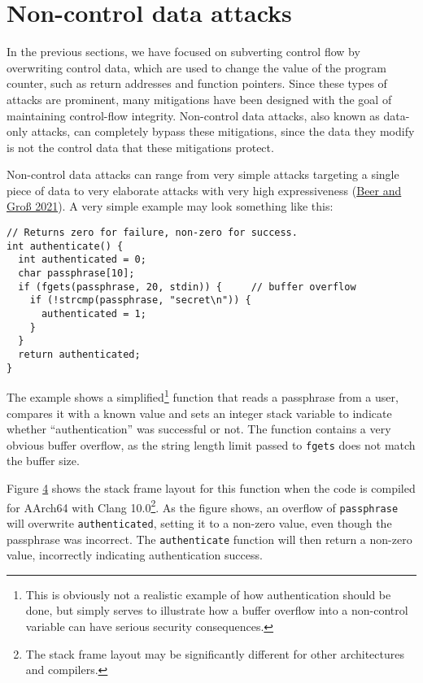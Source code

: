 \documentclass[
  a4paper,
]{report}
\begin{document}
\hypertarget{non-control-data-attacks}{%
\section{Non-control data attacks}\label{non-control-data-attacks}}

In the previous sections, we have focused on subverting control flow by
overwriting control data, which are used to change
the value of the program counter, such as return addresses and function
pointers. Since these types of attacks are prominent, many mitigations
have been designed with the goal of maintaining control-flow integrity.
Non-control data attacks, also known as
data-only attacks, can completely bypass these
mitigations, since the data they modify is not the control data that
these mitigations protect.

Non-control data attacks can range from very simple attacks targeting a
single piece of data to very elaborate attacks with very high
expressiveness (\protect\hyperlink{ref-Beer2021}{Beer and Groß 2021}). A
very simple example may look something like this:

\begin{verbatim}
// Returns zero for failure, non-zero for success.
int authenticate() {
  int authenticated = 0;
  char passphrase[10];
  if (fgets(passphrase, 20, stdin)) {     // buffer overflow
    if (!strcmp(passphrase, "secret\n")) {
      authenticated = 1;
    }
  }
  return authenticated;
}
\end{verbatim}

The example shows a simplified\footnote{This is obviously not a
  realistic example of how authentication should be done, but simply
  serves to illustrate how a buffer overflow into a non-control variable
  can have serious security consequences.} function that reads a
passphrase from a user, compares it with a known value and sets an
integer stack variable to indicate whether ``authentication'' was
successful or not. The function contains a very obvious buffer overflow,
as the string length limit passed to \texttt{fgets} does not match the
buffer size.

Figure \protect\hyperlink{fig:non-control-data-attack}{4} shows the
stack frame layout for this function when the code is compiled for
AArch64 with Clang 10.0\footnote{The stack frame layout may be
  significantly different for other architectures and compilers.}. As
the figure shows, an overflow of \texttt{passphrase} will overwrite
\texttt{authenticated}, setting it to a non-zero value, even though the
passphrase was incorrect. The \texttt{authenticate} function will then
return a non-zero value, incorrectly indicating authentication success.
\end{document}
